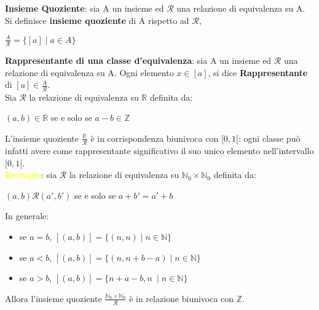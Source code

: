 \textbf{Insieme Quoziente}: sia A un insieme ed $\mathcal{R}$ una relazione di equivalenza su A. Si definisce \textbf{insieme quoziente} di A rispetto ad $\mathcal{R}$,
\begin{center}
    $\frac{A}{\mathcal{R}} = \{[a] \; | \; a \in A\}$
\end{center}
\textbf{Rappresentante di una classe d'equivalenza}: sia A un insieme ed $\mathcal{R}$ una relazione di equivalenza su A. Ogni elemento $x \in [a]$, si dice \textbf{Rappresentante} di $[a] \in \frac{A}{\mathcal{R}}$. \\
Sia $\mathcal{R}$ la relazione di equivalenza su $\mathbb{R}$ definita da:
\begin{center}
    $(a, b) \in \mathbb{R}$ se e solo se $a - b \in \mathbb{Z}$
\end{center}
L'insieme quoziente $\frac{\mathbb{R}}{\mathcal{R}}$ è in corrispondenza biunivoca con $[0, 1[$: ogni classe può infatti avere come rappresentante significativo il suo unico elemento nell'intervallo $[0, 1[$. \\
\textcolor{yellow}{\textbf{Esempio}}: sia $\mathcal{R}$ la relazione di equivalenza su $\mathbb{N}_0 \times \mathbb{N}_0$ definita da:
\begin{center}
    $(a,b)\mathcal{R}(a',b')$ se e solo se $a+b' = a'+b$
\end{center}
In generale:
\begin{itemize}[nosep]
    \item se $a=b$, $[(a,b)] = \{(n,n) \; | \; n \in \mathbb{N}\}$
    \item se $a<b$, $[(a,b)] = \{(n,n+b-a) \; | \; n \in \mathbb{N}\}$
    \item se $a>b$, $[(a,b)] = \{n+a-b,n\ \; | \; n \in \mathbb{N}\}$
\end{itemize}
Allora l'insieme quoziente $\frac{\mathbb{N}_0 \times \mathbb{N}_0}{\mathcal{R}}$ è in relazione biunivoca con $\mathbb{Z}$. \\ 

